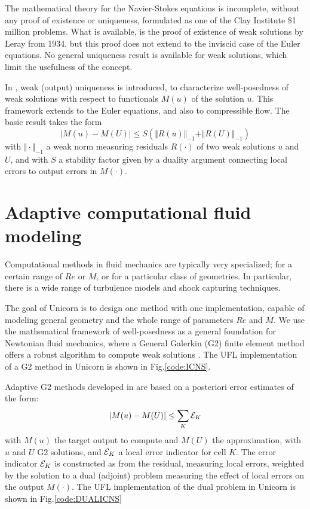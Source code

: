 The mathematical theory for the Navier-Stokes equations is incomplete,
without any proof of existence or uniqueness, formulated as one of the
Clay Institute \$1 million problems.  What is available, is the proof
of existence of weak solutions by Leray from 1934, but this proof does
not extend to the inviscid case of the Euler equations.  No general
uniqueness result is available for weak solutions, which limit the
usefulness of the concept.

In \cite{HoffmanJohnson2008}, weak (output) uniqueness is introduced,
to characterize well-posedness of weak solutions with respect to
functionals $M(u)$ of the solution $u$. This framework extends to the
Euler equations, and also to compressible flow. The basic result takes
the form
\begin{equation}
\vert M(u) - M(U) \vert \leq S (\Vert R(u)\Vert_{-1} + \Vert R(U)\Vert_{-1})
\end{equation}
with $\Vert \cdot \Vert _{-1}$ a weak norm measuring residuals $R(\cdot)$ of two weak solutions $u$ and
$U$, and with $S$ a stability factor given by a duality argument connecting local errors to output errors
in $M(\cdot)$.

\section{Adaptive computational fluid modeling}

Computational methods in fluid mechanics are typically very
specialized; for a certain range of $Re$ or $M$, or for a particular
class of geometries. In particular, there is a wide range of
turbulence models and shock capturing techniques.

The goal of Unicorn is to design one method with one implementation,
capable of modeling general geometry and the whole range of parameters
$Re$ and $M$. We use the mathematical framework of well-posedness as a
general foundation for Newtonian fluid mechanics, where a General
Galerkin (G2) finite element method offers a robust algorithm to
compute weak solutions \cite{HoffmanJohnson2006}.  The UFL
implementation of a G2 method in Unicorn is shown in
Fig.\ref{code:ICNS}.

Adaptive G2 methods developed
in \cite{HoffmanJohnson2006a,Hoffman2005,Hoffman2009,Hoffman2006} are
based on a posteriori error estimates of the form:
\begin{equation}
\vert M(u) - M(U) \vert \leq \sum_K {\cal E}_K
\end{equation}
with $M(u)$ the target output to compute and $M(U)$ the approximation,
with $u$ and $U$ G2 solutions, and ${\cal E}_K$ a local error
indicator for cell $K$.  The error indicator ${\cal E}_K$ is
constructed as from the residual, measuring local errors, weighted by
the solution to a dual (adjoint) problem measuring the effect of local
errors on the output $M(\cdot)$. The UFL implementation of the dual
problem in Unicorn is shown in Fig.\ref{code:DUALICNS}

